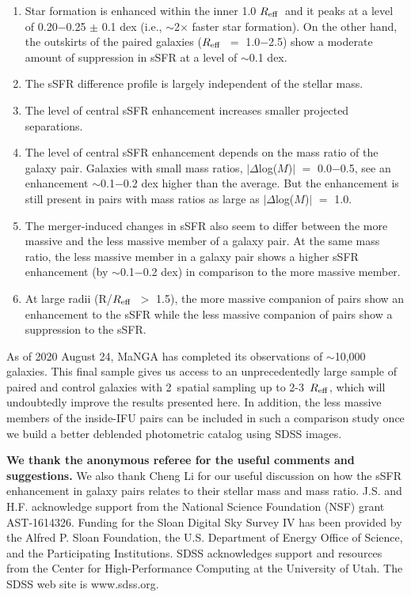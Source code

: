 \documentclass[iop,revtex4,twocolumn,apj,numberedappendix,appendixfloats]{emulateapj}
\newcommand{\reff}{$R_{\rm eff}$}
\begin{document}
\begin{enumerate}

\item Star formation is enhanced within the inner 1.0 \reff\ and it peaks at a level of 0.20$-$0.25 $\pm$ 0.1 dex (i.e., $\sim$2$\times$ faster star formation). On the other hand, the outskirts of the paired galaxies (\reff\ $=$ 1.0$-$2.5) show a moderate amount of suppression in sSFR at a level of $\sim$0.1 dex.
 
\item The sSFR difference profile is largely independent of the stellar mass.

\item The level of central sSFR enhancement increases smaller projected separations. 

\item The level of central sSFR enhancement depends on the mass ratio of the galaxy pair. Galaxies with small mass ratios, $|\Delta$log($M$)$|$ $=$ 0.0$-$0.5, see an enhancement $\sim$0.1$-$0.2 dex higher than the average. But the enhancement is still present in pairs with mass ratios as large as $|\Delta$log($M$)$|$ $=$ 1.0. 

\item The merger-induced changes in sSFR also seem to differ between the more massive and the less massive member of a galaxy pair. At the same mass ratio, the less massive member in a galaxy pair shows a higher sSFR enhancement (by $\sim$0.1$-$0.2 dex) in comparison to the more massive member. 

\item At large radii (R/\reff\ $>$ 1.5), the more massive companion of pairs show an enhancement to the sSFR while the less massive companion of pairs show a suppression to the sSFR.

\end{enumerate}

As of 2020 August 24, MaNGA has completed its observations of $\sim$10,000 galaxies. This final sample gives us access to an unprecedentedly large sample of paired and control galaxies with 2\arcsec\ spatial sampling up to 2-3~\reff, which will undoubtedly improve the results presented here. In addition, the less massive members of the inside-IFU pairs can be included in such a comparison study once we build a better deblended photometric catalog using SDSS images.

\acknowledgments

\textbf{We thank the anonymous referee for the useful comments and suggestions.} We also thank Cheng Li for our useful discussion on how the sSFR enhancement in galaxy pairs relates to their stellar mass and mass ratio. J.S. and H.F. acknowledge support from the National Science Foundation (NSF) grant AST-1614326. Funding for the Sloan Digital Sky Survey IV has been provided by the Alfred P. Sloan Foundation, the U.S. Department of Energy Office of Science, and the Participating Institutions. SDSS acknowledges support and resources from the Center for High-Performance Computing at the University of Utah. The SDSS web site is www.sdss.org.
\end{document}
